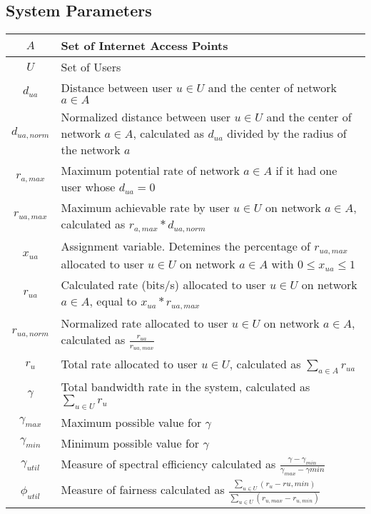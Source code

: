 \documentclass[11pt]{article}
\begin{document}
\subsection{System Parameters}
\begin{center}
\renewcommand\arraystretch{1.2}
\begin{tabular}{| c | p{12cm} |}
\hline
$A$ & Set of Internet Access Points \\ 
\hline
$U$ & Set of Users \\ 
\hline
$d_{ua}$ & Distance between user $u \in U$ and the center of network $a \in A$ \\ 
\hline
$d_{ua,norm}$ & Normalized distance between user $u \in U$ and the center of network $a \in A$, calculated as $d_{ua}$ divided by the radius of the network $a$ \\ 
\hline
$r_{a,max}$ & Maximum potential rate of network $a \in A$ if it had one user whose $d_{ua} = 0$ \\ 
\hline
$r_{ua,max}$ & Maximum achievable rate by user $u \in U$ on network $a \in A$, calculated as $r_{a,max} * d_{ua,norm}$ \\ 
\hline
$x_{ua}$ & Assignment variable. Detemines the percentage of $r_{ua,max}$ allocated to user $u \in U$ on network $a \in A$ with $0 \leq x_{ua} \leq 1$ \\ 
\hline
$r_{ua}$ & Calculated rate (bits/s) allocated to user $u \in U$ on network $a \in A$, equal to $x_{ua} * r_{ua,max}$ \\ 
\hline
$r_{ua,norm}$ & Normalized rate allocated to user $u \in U$ on network $a \in A$, calculated as $\displaystyle\frac{r_{ua}}{r_{ua,max}}$ \\[8pt] 
\hline
$r_{u}$ & Total rate allocated to user $u \in U$, calculated as $\sum_{a \in A} r_{ua}$ \\ 
\hline
$\gamma$ & Total bandwidth rate in the system, calculated as $\sum_{u \in U} r_u$ \\ 
\hline
$\gamma_{max}$ & Maximum possible value for $\gamma$ \\ 
\hline
$\gamma_{min}$ & Minimum possible value for $\gamma$ \\ 
\hline
$\gamma_{util}$ & Measure of spectral efficiency calculated as $\displaystyle\frac{\gamma - \gamma_{min}}{\gamma_{max} - \gamma{min}}$ \\[8pt] 
\hline
$\phi_{util}$ & Measure of fairness calculated as $\displaystyle\frac{\sum_{u \in U} (r_u - r{u,min})}{\sum_{u \in U} (r_{u,max} - r_{u,min})}$ \\[8pt] 
\hline
\end{tabular}
\end{center}
\end{document}
